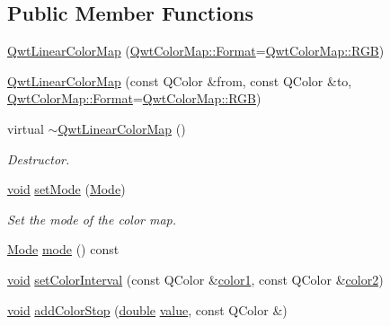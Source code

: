 \subsection*{Public Member Functions}
\begin{DoxyCompactItemize}
\item 
\hyperlink{class_qwt_linear_color_map_a0ef6a29bb027017aad89a4c4a4b07019}{Qwt\-Linear\-Color\-Map} (\hyperlink{class_qwt_color_map_a9e5570790910fa3894887bca7dc5a670}{Qwt\-Color\-Map\-::\-Format}=\hyperlink{class_qwt_color_map_a9e5570790910fa3894887bca7dc5a670a663473fd836d9a84fe48ae1755de326a}{Qwt\-Color\-Map\-::\-R\-G\-B})
\item 
\hyperlink{class_qwt_linear_color_map_ae591cf441db15a021c25d0b58bfa7a5e}{Qwt\-Linear\-Color\-Map} (const Q\-Color \&from, const Q\-Color \&to, \hyperlink{class_qwt_color_map_a9e5570790910fa3894887bca7dc5a670}{Qwt\-Color\-Map\-::\-Format}=\hyperlink{class_qwt_color_map_a9e5570790910fa3894887bca7dc5a670a663473fd836d9a84fe48ae1755de326a}{Qwt\-Color\-Map\-::\-R\-G\-B})
\item 
virtual \hyperlink{class_qwt_linear_color_map_a82caa759e44d439aa9866bd03e2e3696}{$\sim$\-Qwt\-Linear\-Color\-Map} ()
\begin{DoxyCompactList}\small\item\em Destructor. \end{DoxyCompactList}\item 
\hyperlink{group___u_a_v_objects_plugin_ga444cf2ff3f0ecbe028adce838d373f5c}{void} \hyperlink{class_qwt_linear_color_map_afca7397fb6d07d05bab83e83e274a9c2}{set\-Mode} (\hyperlink{class_qwt_linear_color_map_ac8c5f1991f533b1d25a9a0a0874b7d54}{Mode})
\begin{DoxyCompactList}\small\item\em Set the mode of the color map. \end{DoxyCompactList}\item 
\hyperlink{class_qwt_linear_color_map_ac8c5f1991f533b1d25a9a0a0874b7d54}{Mode} \hyperlink{class_qwt_linear_color_map_a9ec309df6ec88472a63b14ac2c692c96}{mode} () const 
\item 
\hyperlink{group___u_a_v_objects_plugin_ga444cf2ff3f0ecbe028adce838d373f5c}{void} \hyperlink{class_qwt_linear_color_map_abfae35c30755c0bbd1447342055e9a13}{set\-Color\-Interval} (const Q\-Color \&\hyperlink{class_qwt_linear_color_map_a3ab5066b01409f58e4ad0425474b1530}{color1}, const Q\-Color \&\hyperlink{class_qwt_linear_color_map_a9fa696fff9ec599f0c305f73345ecab3}{color2})
\item 
\hyperlink{group___u_a_v_objects_plugin_ga444cf2ff3f0ecbe028adce838d373f5c}{void} \hyperlink{class_qwt_linear_color_map_aa7162a034e882e752c15051439bb2c99}{add\-Color\-Stop} (\hyperlink{_super_l_u_support_8h_a8956b2b9f49bf918deed98379d159ca7}{double} \hyperlink{glext_8h_aa0e2e9cea7f208d28acda0480144beb0}{value}, const Q\-Color \&)

\end{DoxyCompactItemize}
